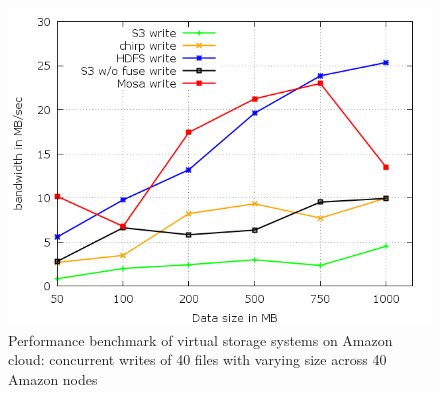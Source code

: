 \documentclass[10pt,journal,cspaper,compsoc]{IEEEtran}
\begin{document}
\begin{figure}[htb]
\begin{center}
\includegraphics[width=\linewidth]{plots/par-write-bw.png}
\caption{Performance benchmark of virtual storage systems on Amazon cloud:
concurrent writes of 40 files with varying size across 40 Amazon nodes
\label{fig:par-wr-bench} }
\end{center}
\end{figure}
\end{document}
